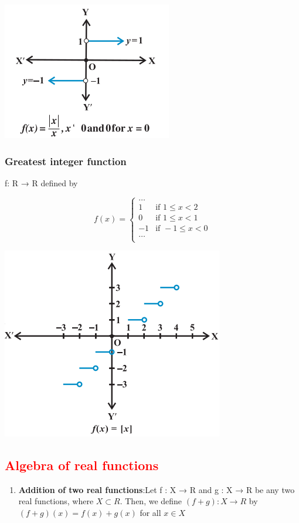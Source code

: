 \documentclass{article}
\begin{document}
\begin{multicols}{2}
\includegraphics[scale=0.6]{8.png}

\subsubsection*{Greatest integer function}
f: R → R defined by 

 \begin{equation*}
f(x)=
    \begin{cases}
        \dots \\
        1 & \text{if } 1 \leq x < 2\\
        0 & \text{if } 1 \leq x < 1 \\
        -1 & \text{if } -1 \leq x < 0 \\
        \dots \\
    \end{cases}
\end{equation*}

\includegraphics[scale=0.5]{9.png}


\subsection*{\textcolor{red}{Algebra of real functions}}
\begin{enumerate}
    \item \textbf{Addition of two real functions}:Let f : X → R and g : X → R be any two real functions, where $X \subset R$. Then, we define $(f + g) : X \rightarrow R$ by $(f + g)(x) = f(x) + g(x)$ for all $x \in X$


\end{enumerate}
\end{multicols}
\end{document}
